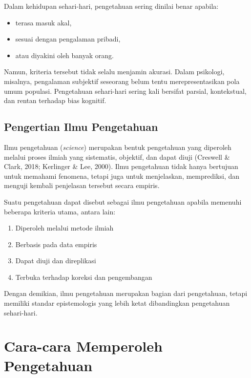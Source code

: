 \documentclass[
  indonesian,
  letterpaper,
  DIV=11,
  numbers=noendperiod]{scrreprt}
\providecommand{\tightlist}{%
  \setlength{\itemsep}{0pt}\setlength{\parskip}{0pt}}
\begin{document}
Dalam kehidupan sehari-hari, pengetahuan sering dinilai benar apabila:

\begin{itemize}
\tightlist
\item
  terasa masuk akal,
\item
  sesuai dengan pengalaman pribadi,
\item
  atau diyakini oleh banyak orang.
\end{itemize}

Namun, kriteria tersebut tidak selalu menjamin akurasi. Dalam psikologi,
misalnya, pengalaman subjektif seseorang belum tentu merepresentasikan
pola umum populasi. Pengetahuan sehari-hari sering kali bersifat
parsial, kontekstual, dan rentan terhadap bias kognitif.

\subsection{Pengertian Ilmu
Pengetahuan}\label{pengertian-ilmu-pengetahuan}

Ilmu pengetahuan (\emph{science}) merupakan bentuk pengetahuan yang
diperoleh melalui proses ilmiah yang sistematis, objektif, dan dapat
diuji (Creswell \& Clark, 2018; Kerlinger \& Lee, 2000). Ilmu
pengetahuan tidak hanya bertujuan untuk memahami fenomena, tetapi juga
untuk menjelaskan, memprediksi, dan menguji kembali penjelasan tersebut
secara empiris.

Suatu pengetahuan dapat disebut sebagai ilmu pengetahuan apabila
memenuhi beberapa kriteria utama, antara lain:

\begin{enumerate}
\def\labelenumi{\arabic{enumi}.}
\tightlist
\item
  Diperoleh melalui metode ilmiah
\item
  Berbasis pada data empiris
\item
  Dapat diuji dan direplikasi
\item
  Terbuka terhadap koreksi dan pengembangan
\end{enumerate}

Dengan demikian, ilmu pengetahuan merupakan bagian dari pengetahuan,
tetapi memiliki standar epistemologis yang lebih ketat dibandingkan
pengetahuan sehari-hari.

\section{Cara-cara Memperoleh
Pengetahuan}\label{cara-cara-memperoleh-pengetahuan}
\end{document}
